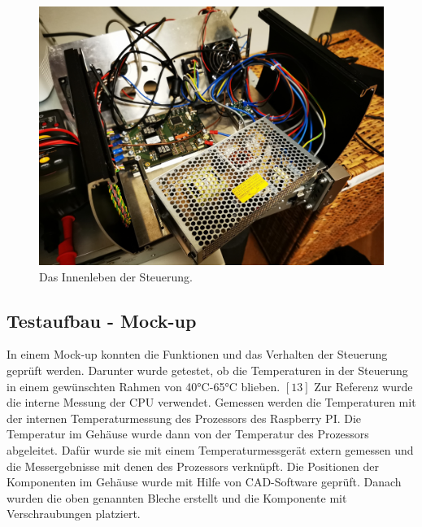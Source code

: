 \begin{figure}[H]
    \centering
    \includegraphics[scale=0.08]{98_images/housing_inside.jpg}
    \caption{Das Innenleben der Steuerung.}
    \label{fig:enter-label}
\end{figure}
\subsection{Testaufbau - Mock-up}
In einem Mock-up konnten die Funktionen und das Verhalten der Steuerung geprüft werden. Darunter wurde getestet, ob die Temperaturen in der Steuerung in einem gewünschten Rahmen von 40°C-65°C blieben. $[13]$ Zur Referenz wurde die interne Messung der CPU verwendet. Gemessen werden die Temperaturen mit der internen Temperaturmessung des Prozessors des Raspberry PI. Die Temperatur im Gehäuse wurde dann von der Temperatur des Prozessors abgeleitet. Dafür wurde sie mit einem Temperaturmessgerät extern gemessen und die Messergebnisse mit denen des Prozessors verknüpft.
Die Positionen der Komponenten im Gehäuse wurde mit Hilfe von CAD-Software geprüft. Danach wurden die oben genannten Bleche erstellt und die Komponente mit Verschraubungen platziert.